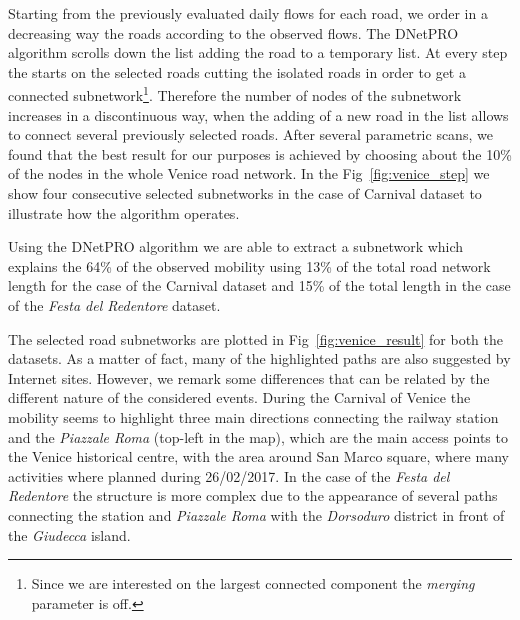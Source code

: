 \documentclass{standalone}
\begin{document}
Starting from the previously evaluated daily flows for each road, we order in a decreasing way the roads according to the observed
flows.
The DNetPRO algorithm scrolls down the list adding the road to a temporary list.
At every step the  starts on the selected roads cutting the isolated roads in order to get a connected subnetwork\footnote{
  Since we are interested on the largest connected component the \emph{merging} parameter is off.
}.
Therefore the number of nodes of the subnetwork increases in a discontinuous way, when the adding of a new road in the list allows to
connect several previously selected roads.
After several parametric scans, we found that the best result for our purposes is achieved by choosing about the 10\% of the nodes in the whole Venice road network.
In the Fig~\ref{fig:venice_step} we show four consecutive selected subnetworks in the case of Carnival dataset to illustrate how the algorithm operates.


Using the DNetPRO algorithm we are able to extract a subnetwork which explains the 64\% of the observed mobility using 13\% of the total road network length for the case of the Carnival dataset and 15\% of the total length in the case of the \emph{Festa del Redentore} dataset.

The selected road subnetworks are plotted in Fig~\ref{fig:venice_result} for both the datasets.
As a matter of fact, many of the highlighted paths are also suggested by Internet sites.
However, we remark some differences that can be related by the different nature of the considered events.
During the Carnival of Venice the mobility seems to highlight three main directions connecting the railway station and the \emph{Piazzale Roma} (top-left in the map), which are the main access points to the Venice historical centre, with the area around San Marco square, where many activities where planned during 26/02/2017.
In the case of the \emph{Festa del Redentore} the structure is more complex due to the appearance of several paths connecting the station and \emph{Piazzale Roma} with the \emph{Dorsoduro} district in front of the \emph{Giudecca} island.
\end{document}

